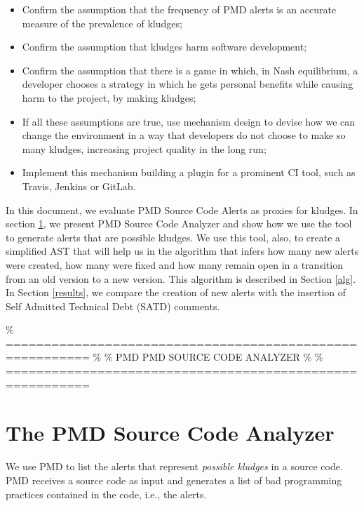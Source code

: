 \documentclass[
]{article}
\begin{document}
\begin{itemize}
\item
  Confirm the assumption that the frequency of PMD alerts is an accurate
  measure of the prevalence of kludges;
  
\item
  Confirm the assumption that kludges harm software development;

\item
  Confirm the assumption that there is a game in which, in Nash
  equilibrium, a developer chooses a strategy in which he gets personal
  benefits while causing harm to the project, by making kludges;

\item
  If all these assumptions are true, use mechanism design to devise how
  we can change the environment in a way that developers do not choose
  to make so many kludges, increasing project quality in the long run;

\item
  Implement this mechanism building a plugin for a prominent CI tool,
  such as Travis, Jenkins or GitLab.
\end{itemize}

In this document, we evaluate PMD Source Code Alerts as proxies for
kludges. In section \ref{pmd}, we present PMD Source Code Analyzer and
show how we use the tool to generate alerts that are possible kludges.
We use this tool, also, to create a simplified AST that will help us in
the algorithm that infers how many new alerts were created, how many
were fixed and how many remain open in a transition from an old version
to a new version. This algorithm is described in Section \ref{alg}. In
Section \ref{results}, we compare the creation of new alerts with the
insertion of Self Admitted Technical Debt (SATD) comments.

\% ========================================================= \% \% PMD
PMD SOURCE CODE ANALYZER \% \%
=========================================================

\section{The PMD Source Code Analyzer}\label{pmd}

We use PMD to list the alerts that represent \textit{possible kludges}
in a source code. PMD receives a source code as input and generates a
list of bad programming practices contained in the code, i.e., the
alerts.
\end{document}
